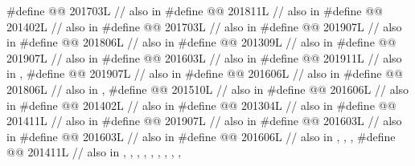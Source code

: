 \begin{codeblock}
#define @@                      201703L // also in 
#define @@             201811L // also in 
#define @@                          201402L // also in 
#define @@                      201703L // also in 
#define @@              201907L // also in 
#define @@            201806L // also in 
#define @@                   201309L // also in 
#define @@       201907L // also in 
#define @@                      201603L // also in 
#define @@                           201911L // also in , 
#define @@                             201907L // also in 
#define @@                           201606L // also in 
#define @@           201806L // also in , 
#define @@                    201510L // also in 
#define @@                   201606L // also in 
#define @@             201402L // also in 
#define @@                       201304L // also in 
#define @@                   201411L // also in 
#define @@                    201907L // also in 
#define @@            201603L // also in 
#define @@                   201603L // also in 
#define @@                      201606L
  // also in , , , 
#define @@        201411L
  // also in , , , , , , , , ,

\end{codeblock}

